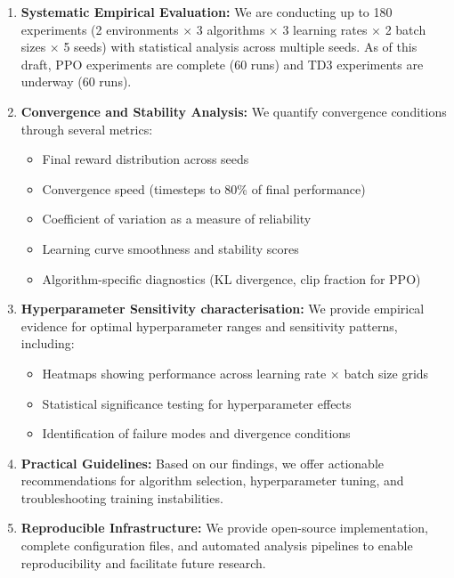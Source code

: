 \documentclass[12pt,a4paper]{report}
\begin{document}
\begin{enumerate}
    \item \textbf{Systematic Empirical Evaluation:} We are conducting up to 180 experiments (2 environments $\times$ 3 algorithms $\times$ 3 learning rates $\times$ 2 batch sizes $\times$ 5 seeds) with statistical analysis across multiple seeds. As of this draft, PPO experiments are complete (60 runs) and TD3 experiments are underway (60 runs).

    \item \textbf{Convergence and Stability Analysis:} We quantify convergence conditions through several metrics:
    \begin{itemize}
        \item Final reward distribution across seeds
        \item Convergence speed (timesteps to 80\% of final performance)
        \item Coefficient of variation as a measure of reliability
        \item Learning curve smoothness and stability scores
        \item Algorithm-specific diagnostics (KL divergence, clip fraction for PPO)
    \end{itemize}

    \item \textbf{Hyperparameter Sensitivity characterisation:} We provide empirical evidence for optimal hyperparameter ranges and sensitivity patterns, including:
    \begin{itemize}
        \item Heatmaps showing performance across learning rate × batch size grids
        \item Statistical significance testing for hyperparameter effects
        \item Identification of failure modes and divergence conditions
    \end{itemize}

    \item \textbf{Practical Guidelines:} Based on our findings, we offer actionable recommendations for algorithm selection, hyperparameter tuning, and troubleshooting training instabilities.

    \item \textbf{Reproducible Infrastructure:} We provide open-source implementation, complete configuration files, and automated analysis pipelines to enable reproducibility and facilitate future research.
\end{enumerate}
\end{document}
